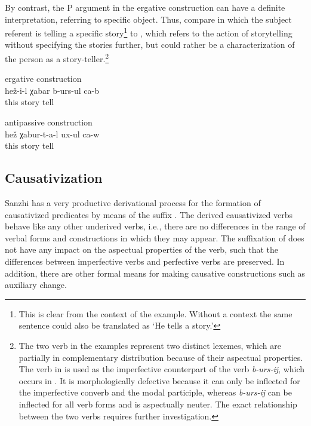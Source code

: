 By contrast, the P argument in the ergative construction can have a definite interpretation, referring to specific object. Thus, compare  in which the subject referent is telling a specific story\footnote{This is clear from the context of the example. Without a context the same sentence could also be translated as `He tells a story.'} to , which refers to the action of storytelling without specifying the stories further, but could rather be a characterization of the person as a story-teller.\footnote{The two verb in the examples represent two distinct lexemes, which are partially in complementary distribution because of their aspectual properties. The verb in  is used as the imperfective counterpart of the verb \textit{b-urs-ij}, which occurs in . It is morphologically defective because it can only be inflected for the imperfective converb and the modal participle, whereas \textit{b-urs-ij} can be inflected for all verb forms and is aspectually neuter. The exact relationship between the two verbs requires further investigation.} 
%
\begin{exe}
	\ex	ergative construction \label{ex:He tells the story} \\
	\gll	hež-i-l	χabar	b-urs-ul	ca-b\\
		this	story	tell	\\
	\glt	{}

	\ex	antipassive construction \label{ex:He tells many stories} \\
	\gll	hež	χabur-t-a-l	ux-ul	ca-w\\
		this	story	tell	\\
	\glt	{}
\end{exe}



\subsection{Causativization}
\label{sec:Causativization}

Sanzhi has a very productive derivational process for the formation of causativized predicates by means of the suffix . The derived causativized verbs behave like any other underived verbs, i.e., there are no differences in the range of verbal forms and constructions in which they may appear. The suffixation of  does not have any impact on the aspectual properties of the verb, such that the differences between imperfective verbs and perfective verbs are preserved. In addition, there are other formal means for making causative constructions such as auxiliary change.

